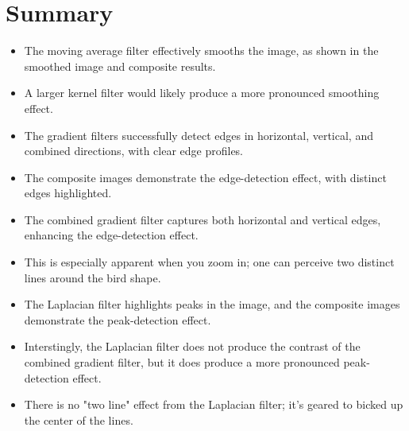 \documentclass[12pt]{article}
\begin{document}
\newpage
\section*{Summary}
\begin{itemize}
    \item The moving average filter effectively smooths the image, as shown in the smoothed image and composite results.
    \item A larger kernel filter would likely produce a more pronounced smoothing effect.
    \item The gradient filters successfully detect edges in horizontal, vertical, and combined directions, with clear edge profiles.
    \item The composite images demonstrate the edge-detection effect, with distinct edges highlighted.
    \item The combined gradient filter captures both horizontal and vertical edges, enhancing the edge-detection effect.
    \item This is especially apparent when you zoom in; one can perceive two distinct lines around the bird shape.
    \item The Laplacian filter highlights peaks in the image, and the composite images demonstrate the peak-detection effect.
    \item Interstingly, the Laplacian filter does not produce the contrast of the combined gradient filter, but it does produce a more pronounced peak-detection effect.
    \item There is no "two line" effect from the Laplacian filter; it's geared to bicked up the center of the lines.
\end{itemize}
\end{document}
